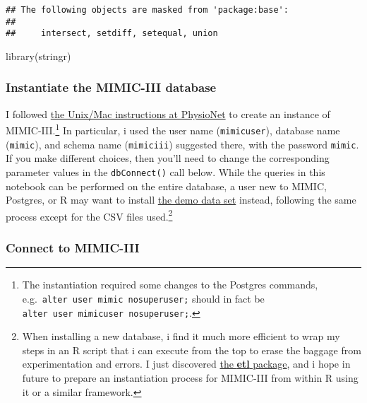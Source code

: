 \documentclass[
]{article}
\newenvironment{Shaded}{\begin{snugshade}}{\end{snugshade}}
\newcommand{\FunctionTok}[1]{\textcolor[rgb]{0.00,0.00,0.00}{#1}}
\newcommand{\NormalTok}[1]{#1}
\begin{document}
\begin{verbatim}
## The following objects are masked from 'package:base':
## 
##     intersect, setdiff, setequal, union
\end{verbatim}

\begin{Shaded}
\begin{Highlighting}[]
\FunctionTok{library}\NormalTok{(stringr)}
\end{Highlighting}
\end{Shaded}

\hypertarget{instantiate-the-mimic-iii-database}{%
\subsubsection{Instantiate the MIMIC-III
database}\label{instantiate-the-mimic-iii-database}}

I followed
\href{https://mimic.physionet.org/tutorials/install-mimic-locally-ubuntu/}{the
Unix/Mac instructions at PhysioNet} to create an instance of
MIMIC-III.\footnote{The instantiation required some changes to the
  Postgres commands, e.g.~\texttt{alter\ user\ mimic\ nosuperuser;}
  should in fact be \texttt{alter\ user\ mimicuser\ nosuperuser;}.} In
particular, i used the user name (\texttt{mimicuser}), database name
(\texttt{mimic}), and schema name (\texttt{mimiciii}) suggested there,
with the password \texttt{mimic}. If you make different choices, then
you'll need to change the corresponding parameter values in the
\texttt{dbConnect()} call below. While the queries in this notebook can
be performed on the entire database, a user new to MIMIC, Postgres, or R
may want to install
\href{https://mimic.physionet.org/gettingstarted/demo/}{the demo data
set} instead, following the same process except for the CSV files
used.\footnote{When installing a new database, i find it much more
  efficient to wrap my steps in an R script that i can execute from the
  top to erase the baggage from experimentation and errors. I just
  discovered \href{https://cran.r-project.org/package=etl}{the
  \textbf{etl} package}, and i hope in future to prepare an
  instantiation process for MIMIC-III from within R using it or a
  similar framework.}

\hypertarget{connect-to-mimic-iii}{%
\subsubsection{Connect to MIMIC-III}\label{connect-to-mimic-iii}}
\end{document}

